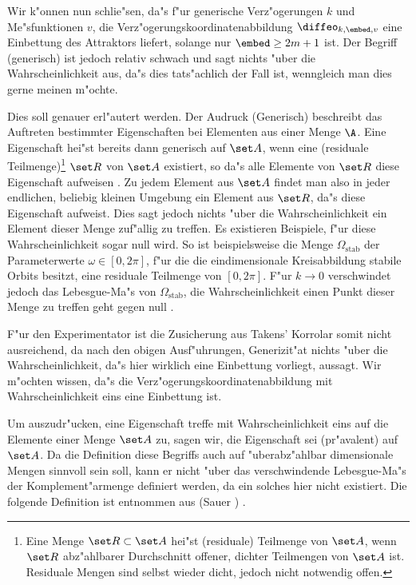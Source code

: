 Wir k"onnen nun schlie"sen, da"s f"ur generische Verz"ogerungen $k$ und Me"sfunktionen
$v$, die Verz"ogerungskoordinatenabbildung $\diffeo_{k,\embed,v}$ eine Einbettung des
Attraktors liefert, solange nur $\embed\geq2m+1$ ist.
Der Begriff \naja(generisch) ist jedoch relativ schwach und sagt nichts "uber die
Wahrscheinlichkeit aus, da"s dies tats"achlich der Fall ist, wenngleich man dies gerne
meinen m"ochte. 

Dies soll genauer erl"autert werden.  Der Audruck \naja(Generisch) beschreibt das
Auftreten bestimmter Eigenschaften bei Elementen aus einer Menge $\A$.
Eine \label{generisch} Eigenschaft hei"st bereits dann generisch auf $\set A$, wenn
eine \begriff(residuale Teilmenge)\footnote{Eine Menge $\set R\subset\set A$ hei"st
\begriff(residuale) Teilmenge von $\set A$, wenn $\set R$ abz"ahlbarer Durchschnitt
offener, dichter Teilmengen von $\set A$ ist. Residuale Mengen sind selbst wieder dicht, jedoch nicht notwendig offen. }
 $\set R$ von $\set A$ existiert, so
da"s alle Elemente von $\set R$ diese Eigenschaft aufweisen \cite{Liebert91}.
Zu jedem Element aus $\set A$ findet man also in
jeder endlichen, beliebig kleinen Umgebung ein Element aus $\set R$, da"s diese
Eigenschaft aufweist. Dies sagt jedoch nichts "uber die
Wahrscheinlichkeit ein Element dieser Menge zuf"allig zu treffen. Es existieren Beispiele,
f"ur diese Wahrscheinlichkeit sogar null wird. So ist beispielsweise
die Menge $\Omega_{\text{stab}}$ der Parameterwerte $\omega\in[0,2\pi]$, f"ur die die
eindimensionale Kreisabbildung
stabile Orbits besitzt, eine residuale Teilmenge von $[0,2\pi]$. F"ur $k\to0$ verschwindet
jedoch das Lebesgue-Ma"s von $\Omega_{\text{stab}}$, die Wahrscheinlichkeit einen Punkt
dieser Menge zu treffen geht  gegen null \cite{Sauer91}.


F"ur den Experimentator ist die Zusicherung aus Takens' Korrolar somit nicht ausreichend,
da nach den obigen Ausf"uh\-rungen, Generizit"at nichts "uber die
Wahrscheinlichkeit, da"s hier wirklich eine Einbettung vorliegt, aussagt. Wir m"ochten
wissen, da"s die Verz"ogerungskoordinatenabbildung mit Wahrscheinlichkeit eins eine
Einbettung ist.

Um auszudr"ucken, eine Eigenschaft treffe mit Wahrscheinlichkeit eins auf die Elemente
einer Menge $\set A$ zu, sagen wir, die Eigenschaft sei \begriff(pr"avalent) auf $\set A$. 
Da die Definition diese Begriffs auch auf "uberabz"ahlbar dimensionale Mengen sinnvoll
sein soll, kann er nicht "uber das verschwindende Lebesgue-Ma"s der Komplement"armenge
definiert werden, da ein solches hier nicht existiert. Die folgende Definition ist
entnommen aus \autor(Sauer \etal) \cite{Sauer91}.

